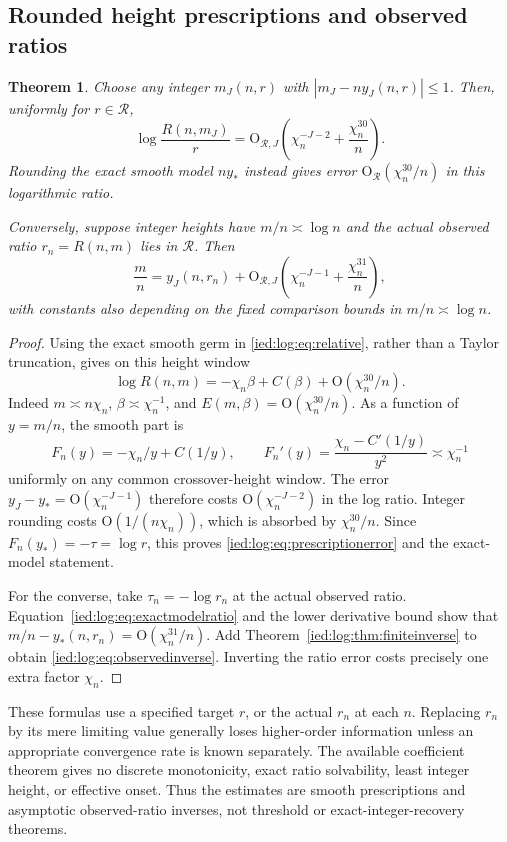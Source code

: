 \documentclass[11pt,letterpaper]{article}
\newtheorem{theorem}{Theorem}[section]
\theoremstyle{remark}\newtheorem{remark}[theorem]{Remark}
\newcommand{\Oh}{\mathrm O}\newcommand{\supp}{\operatorname{supp}}
\begin{document}
\subsection{Rounded height prescriptions and observed ratios}
\begin{theorem}\label{ied:log:thm:integerprescription}
Choose any integer $m_J(n,r)$ with
$|m_J-ny_J(n,r)|\le1$. Then, uniformly for $r\in\mathcal R$,
\begin{equation}\label{ied:log:eq:prescriptionerror}
 \log\frac{R(n,m_J)}r
   =\Oh_{\mathcal R,J}\left(\chi_n^{-J-2}+\frac{\chi_n^{30}}n\right).
\end{equation}
Rounding the exact smooth model $ny_*$ instead gives error
$\Oh_{\mathcal R}(\chi_n^{30}/n)$ in this logarithmic ratio.

Conversely, suppose integer heights have $m/n\asymp\log n$ and the actual observed ratio $r_n=R(n,m)$ lies in $\mathcal R$. Then
\begin{equation}\label{ied:log:eq:observedinverse}
 \frac mn=y_J(n,r_n)
 +\Oh_{\mathcal R,J}\left(\chi_n^{-J-1}+\frac{\chi_n^{31}}n\right),
\end{equation}
with constants also depending on the fixed comparison bounds in $m/n\asymp\log n$.
\end{theorem}
\begin{proof}
Using the exact smooth germ in \eqref{ied:log:eq:relative}, rather than a Taylor truncation, gives on this height window
\begin{equation}\label{ied:log:eq:exactmodelratio}
 \log R(n,m)=-\chi_n\beta+C(\beta)
                         +\Oh(\chi_n^{30}/n).
\end{equation}
Indeed $m\asymp n \chi_n$, $\beta\asymp \chi_n^{-1}$, and
$E(m,\beta)=\Oh(\chi_n^{30}/n)$. As a function of $y=m/n$, the smooth part is
\[
 F_n(y)=-\chi_n/y+C(1/y),\qquad
 F_n'(y)=\frac{\chi_n-C'(1/y)}{y^2}\asymp \chi_n^{-1}
\]
uniformly on any common crossover-height window. The error
$y_J-y_*=\Oh(\chi_n^{-J-1})$ therefore costs $\Oh(\chi_n^{-J-2})$ in the log ratio. Integer rounding costs $\Oh(1/(n\chi_n))$, which is absorbed by $\chi_n^{30}/n$. Since $F_n(y_*)=-\tau=\log r$, this proves \eqref{ied:log:eq:prescriptionerror} and the exact-model statement.

For the converse, take $\tau_n=-\log r_n$ at the actual observed ratio. Equation~\eqref{ied:log:eq:exactmodelratio} and the lower derivative bound show that $m/n-y_*(n,r_n)=\Oh(\chi_n^{31}/n)$. Add Theorem~\ref{ied:log:thm:finiteinverse} to obtain \eqref{ied:log:eq:observedinverse}. Inverting the ratio error costs precisely one extra factor $\chi_n$.
\end{proof}
These formulas use a specified target $r$, or the actual $r_n$ at each $n$. Replacing $r_n$ by its mere limiting value generally loses higher-order information unless an appropriate convergence rate is known separately. The available coefficient theorem gives no discrete monotonicity, exact ratio solvability, least integer height, or effective onset. Thus the estimates are smooth prescriptions and asymptotic observed-ratio inverses, not threshold or exact-integer-recovery theorems.
\end{document}
